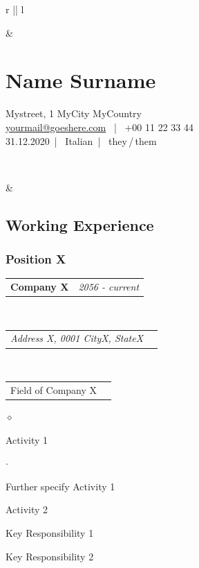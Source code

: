 \documentclass[a4paper]{article}
\makeatletter
\def\name{Name Surname}
\def\email{yourmail@goeshere.com}
\def\telephone{+00 11 22 33 44}
\def\nationality{Italian}
\def\dateofbirth{31.12.2020}
\def\gender{they\,/\,them}
\def\address{Mystreet, 1 \newline 0123 MyCity \newline MyCountry}
\newlength{\sectsep}
\newlength{\detsep}
\newcommand{\headerrow}[2]
{\begin{tabular*}{\textwidth}{l@{\extracolsep{\fill}}r}
    #1 &
    #2 \\
\end{tabular*}}
\renewenvironment{itemize}{
  \begin{list}{$\diamond$}{
    \setlength{\topsep}{0.1em}
    \setlength{\itemsep}{0em}
    \setlength{\parskip}{0pt}
    \setlength{\parsep}{0em}
  }
}{
  \end{list}
}
\newenvironment{itemize2}{
  \begin{list}{$\cdot$}{
    \setlength{\topsep}{0.1em}
    \setlength{\itemsep}{0em}
    \setlength{\parskip}{0pt}
    \setlength{\parsep}{0em}
  }
}{
  \end{list}
}
\makeatother
\begin{document}
  \begin{longtable}{r || l}

  \hfill
  & \begin{minipage}{0.5\textwidth}
      \vspace{0.2\sectsep}
      \section*{\name}
      \vspace{\detsep}
      \address \vspace{\detsep} \\
      \href{mailto:\email}{\email} ~|~ \telephone \vspace{\detsep} \\
      \dateofbirth ~|~ \nationality ~|~ \gender \vspace{\detsep} \\
    \end{minipage} \\
  \hline \hline

  & \begin{minipage}{0.9\textwidth}
      \vspace{\sectsep}
      \subsection*{Working Experience}
      \subsubsection*{Position X}
      \headerrow
  		{\textbf{Company X}}{\emph{2056 - current}}
      \\
      \headerrow
        {\emph{Address X, 0001 CityX, StateX}}{}
      \\
      \headerrow
        {Field of Company X}{}

      \begin{itemize}
          \item Activity 1
          \begin{itemize2}
              \item Further specify Activity 1
          \end{itemize2}
          \item Activity 2
          \item Key Responsibility 1
          \item Key Responsibility 2
      \end{itemize}
  \end{minipage} \\[\sectsep]


\end{longtable}
\end{document}
